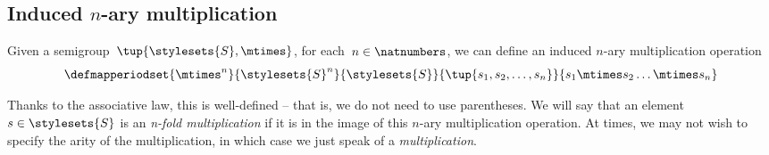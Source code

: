 
\subsection{Induced $n$-ary multiplication}
Given a semigroup~$\tup{\stylesets{S}, \mtimes}$, for each~$n \in \natnumbers$, we can define an induced $n$-ary multiplication operation
% 
\begin{equation*}
	\defmapperiodset{\mtimes^n}{\stylesets{S}^n}{\stylesets{S}}{\tup{s_1, s_2, \dots, s_n}}{ s_1 \mtimes s_2 \dots \mtimes s_n}
\end{equation*}


Thanks to the associative law, this is well-defined -- that is, we do not need to use parentheses.
We will say that an element~$s \in \stylesets{S}$ is an \emph{n-fold multiplication} if it is in the image of this $n$-ary multiplication operation.
At times, we may not wish to specify the arity of the multiplication, in which case we just speak of a \emph{multiplication}.

\showslides{
	\begin{forslides}
		\begin{equation}
			\label{eq:sg-mora}
			\mora
		\end{equation}
		\begin{equation}
			\label{eq:sg-morb}
			\morb
		\end{equation}
		\begin{equation}
			\label{eq:sg-morab}
			\mora\then\morb
		\end{equation}
	\end{forslides}
}
